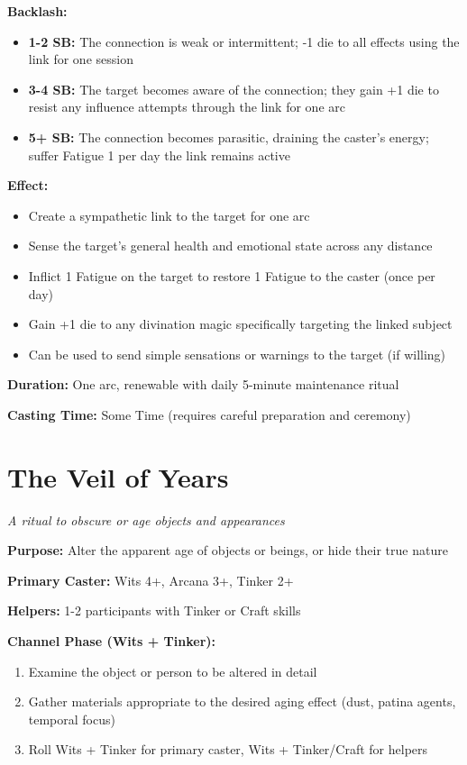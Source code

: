 \textbf{Backlash:}
\begin{itemize}
\item \textbf{1-2 SB:} The connection is weak or intermittent; -1 die to all effects using the link for one session
\item \textbf{3-4 SB:} The target becomes aware of the connection; they gain +1 die to resist any influence attempts through the link for one arc
\item \textbf{5+ SB:} The connection becomes parasitic, draining the caster's energy; suffer Fatigue 1 per day the link remains active
\end{itemize}

\textbf{Effect:}
\begin{itemize}
\item Create a sympathetic link to the target for one arc
\item Sense the target's general health and emotional state across any distance
\item Inflict 1 Fatigue on the target to restore 1 Fatigue to the caster (once per day)
\item Gain +1 die to any divination magic specifically targeting the linked subject
\item Can be used to send simple sensations or warnings to the target (if willing)
\end{itemize}

\textbf{Duration:} One arc, renewable with daily 5-minute maintenance ritual

\textbf{Casting Time:} Some Time (requires careful preparation and ceremony)

\section*{The Veil of Years}
\textit{A ritual to obscure or age objects and appearances}

\textbf{Purpose:} Alter the apparent age of objects or beings, or hide their true nature

\textbf{Primary Caster:} Wits 4+, Arcana 3+, Tinker 2+

\textbf{Helpers:} 1-2 participants with Tinker or Craft skills

\textbf{Channel Phase (Wits + Tinker):}
\begin{enumerate}
\item Examine the object or person to be altered in detail
\item Gather materials appropriate to the desired aging effect (dust, patina agents, temporal focus)
\item Roll Wits + Tinker for primary caster, Wits + Tinker/Craft for helpers
\end{enumerate}


